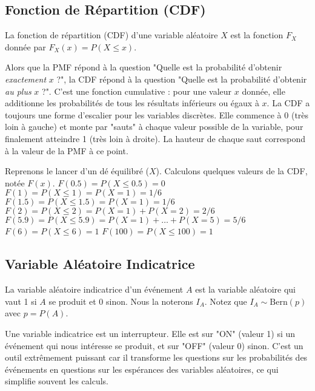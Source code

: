 \subsection{Fonction de Répartition (CDF)}

\begin{definitionbox}
La fonction de répartition (CDF) d'une variable aléatoire $X$ est la fonction $F_X$ donnée par $F_X(x) = P(X \le x)$.
\end{definitionbox}

\begin{intuitionbox}
Alors que la PMF répond à la question "Quelle est la probabilité d'obtenir \textit{exactement} $x$ ?", la CDF répond à la question "Quelle est la probabilité d'obtenir \textit{au plus} $x$ ?". C'est une fonction cumulative : pour une valeur $x$ donnée, elle additionne les probabilités de tous les résultats inférieurs ou égaux à $x$.
La CDF a toujours une forme d'escalier pour les variables discrètes. Elle commence à 0 (très loin à gauche) et monte par "sauts" à chaque valeur possible de la variable, pour finalement atteindre 1 (très loin à droite). La hauteur de chaque saut correspond à la valeur de la PMF à ce point.
\end{intuitionbox}

\begin{examplebox}
Reprenons le lancer d'un dé équilibré ($X$). Calculons quelques valeurs de la CDF, notée $F(x)$.
\newline
$F(0.5) = P(X \le 0.5) = 0$
\newline
$F(1) = P(X \le 1) = P(X=1) = 1/6$
\newline
$F(1.5) = P(X \le 1.5) = P(X=1) = 1/6$
\newline
$F(2) = P(X \le 2) = P(X=1) + P(X=2) = 2/6$
\newline
$F(5.9) = P(X \le 5.9) = P(X=1) + \dots + P(X=5) = 5/6$
\newline
$F(6) = P(X \le 6) = 1$
\newline
$F(100) = P(X \le 100) = 1$
\end{examplebox}

\subsection{Variable Aléatoire Indicatrice}

\begin{definitionbox}
La variable aléatoire indicatrice d'un événement $A$ est la variable aléatoire qui vaut 1 si $A$ se produit et 0 sinon. Nous la noterons $I_A$. Notez que $I_A \sim \text{Bern}(p)$ avec $p=P(A)$.
\end{definitionbox}

\begin{intuitionbox}
Une variable indicatrice est un interrupteur. Elle est sur "ON" (valeur 1) si un événement qui nous intéresse se produit, et sur "OFF" (valeur 0) sinon. C'est un outil extrêmement puissant car il transforme les questions sur les probabilités des événements en questions sur les espérances des variables aléatoires, ce qui simplifie souvent les calculs.
\end{intuitionbox}